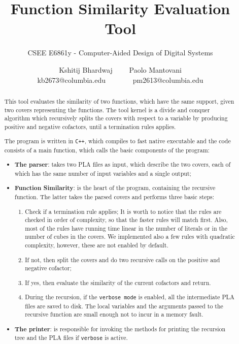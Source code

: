 \documentclass{acm_proc_article-sp}
\begin{document}
\title{Function Similarity Evaluation Tool}
\subtitle{CSEE E6861y - Computer-Aided Design of Digital Systems}

\author{
\alignauthor
Kshitij Bhardwaj \ \ \ \ Paolo Mantovani\\
{\small kb2673@columbia.edu \ \ \ \ \ \ \ pm2613@columbia.edu}
}

\maketitle

\begin{abstract}
This tool evaluates the similarity of two functions, which have the same support,
given two covers representing the functions. The tool kernel is a divide and
conquer algorithm which recursively splits the covers with respect to a variable
by producing positive and negative cofactors, until a termination rules applies.

The program is written in \texttt{C++}, which compiles to fast native executable
and the code consists of a main function, which calls the basic components of
the program:
\begin{itemize}
  \item {\bf The parser}: takes two PLA files as input, which describe the two
    covers, each of which has the same number of input variables and a single
    output;
  \item {\bf Function Similarity}: is the heart of the program, containing the
    recursive function. The latter takes the parsed covers and performs three
    basic steps:
    \begin{enumerate}
      \item Check if a termination rule applies; It is worth to notice that the
        rules are checked in order of complexity, so that the faster rules will
        match first. Also, most of the rules have running time linear in the
        number of literals or in the number of cubes in the covers.
        We implemented also a few rules with quadratic complexity, however,
        these are not enabled by default.
      \item If not, then split the covers and do two recursive calls on the
        positive and negative cofactor;
      \item If yes, then evaluate the similarity of the current cofactors and
        return.
      \item During the recursion, if the \texttt{verbose mode} is enabled, all
        the intermediate PLA files are saved to disk. The local variables and
        the arguments passed to the recursive function are small enough not to
        incur in a memory fault.
    \end{enumerate}
  \item {\bf The printer}: is responsible for invoking the methods for printing
    the recursion tree and the PLA files if \texttt{verbose} is active.
\end{itemize}

\end{abstract}
\end{document}
